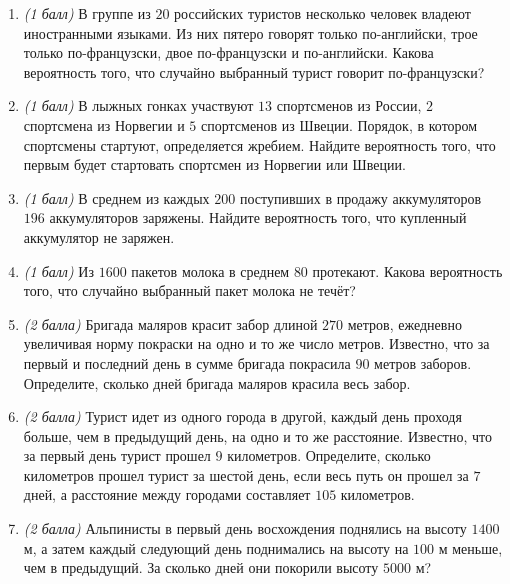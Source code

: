 \documentclass[12pt, a4paper]{article}
\begin{document}
	
	
	\begin{enumerate}
		\item \textit{(1 балл)} В группе из $20$ российских туристов несколько человек владеют иностранными языками. Из них пятеро говорят только по-английски, трое только по-французски, двое по-французски и по-английски. Какова вероятность того, что случайно выбранный турист говорит по-французски?
		\item \textit{(1 балл)} В лыжных гонках участвуют $13$ спортсменов из России, $2$ спортсмена из Норвегии и $5$ спортсменов из Швеции. Порядок, в котором спортсмены стартуют, определяется жребием. Найдите вероятность того, что первым будет стартовать спортсмен из Норвегии или Швеции.
		\item \textit{(1 балл)} В среднем из каждых $200$ поступивших в продажу аккумуляторов $196$ аккумуляторов заряжены. Найдите вероятность того, что купленный аккумулятор не заряжен.
		\item \textit{(1 балл)} Из $1600$ пакетов молока в среднем $80$ протекают. Какова вероятность того, что случайно выбранный пакет молока не течёт?
		\item \textit{(2 балла)} Бригада маляров красит забор длиной $270$ метров, ежедневно увеличивая норму покраски на одно и то же число метров. Известно, что за первый и последний день в сумме бригада покрасила $90$ метров заборов. Определите, сколько дней бригада маляров красила весь забор.
		\item \textit{(2 балла)} Турист идет из одного города в другой, каждый день проходя больше, чем в предыдущий день, на одно и то же расстояние. Известно, что за первый день турист прошел $9$ километров. Определите, сколько километров прошел турист за шестой день, если весь путь он прошел за $7$ дней, а расстояние между городами составляет $105$ километров.
		\item \textit{(2 балла)} Альпинисты в первый день восхождения поднялись на высоту $1400$ м, а затем каждый следующий день поднимались на высоту на $100$ м меньше, чем в предыдущий. За сколько дней они покорили высоту $5000$ м?
	\end{enumerate}
\end{document}
